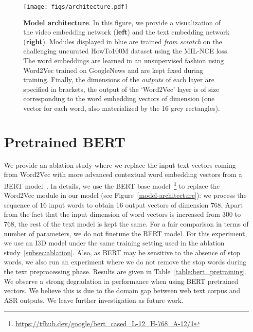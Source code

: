 \documentclass[10pt,twocolumn,letterpaper]{article}
\begin{document}
\begin{figure}[h]
	\centering
	\texttt{[image: figs/architecture.pdf]}
	\caption{\label{fig:architecture} \textbf{Model architecture}. In this figure, we provide a visualization of the video embedding network  (\textbf{left}) and the text embedding network  (\textbf{right}). Modules displayed in blue are trained \emph{from scratch} on the challenging uncurated HowTo100M dataset using the MIL-NCE loss. The word embeddings are learned in an unsupervised fashion using Word2Vec trained on GoogleNews and are kept fixed during training.		
		Finally, the dimensions of the \emph{outputs} of each layer are specified in brackets, \eg the output of the `Word2Vec' layer is of size  corresponding to the  word embedding vectors of dimension  (one vector for each word, also materialized by the 16 grey rectangles).}
\end{figure}

\section{Pretrained BERT} \label{bert-pretrain}
We provide an ablation study where we replace the input text vectors coming from Word2Vec with more advanced contextual word embedding vectors from a BERT model~\cite{bertconf}.
In details, we use the BERT base model~\footnote{\url{https://tfhub.dev/google/bert_cased_L-12_H-768_A-12/1}} to replace the Word2Vec module in our model (see Figure~\ref{model-architecture}): we process the sequence of 16 input words to obtain 16 output vectors of dimension 768.
Apart from the fact that the input dimension of word vectors is increased from 300 to 768, the rest of the text model is kept the same.
For a fair comparison in terms of number of parameters, we do not finetune the BERT model.
For this experiment, we use an I3D model under the same training setting used in the ablation study~\ref{subsec:ablation}.
Also, as BERT may be sensitive to the absence of stop words, we also run an experiment where we do not remove the stop words during the text preprocessing phase.
Results are given in Table~\ref{table:bert_pretraining}.
We observe a strong degradation in performance when using BERT pretrained vectors.
We believe this is due to the domain gap between web text corpus and ASR outputs.
We leave further investigation as future work.

\begin{table}[t]
	\centering  
	\caption{Results when using BERT vectors as inputs instead of Word2vec.}
	\label{table:bert_pretraining}
\end{table}
\end{document}
